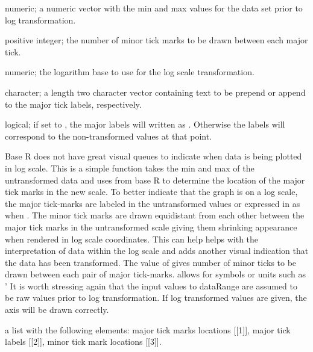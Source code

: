 \documentclass[a4paper]{book}
\begin{document}
\begin{Arguments}
\begin{ldescription}
\item[\code{dataRange}] numeric; a numeric vector with the min and max values for the data set prior to log transformation.

\item[\code{minorCount}] positive integer; the number of minor tick marks to be drawn between each major tick.

\item[\code{logScale}] numeric; the logarithm base to use for the log scale transformation.

\item[\code{axisText}] character; a length two character vector containing text to be prepend or append to the major tick labels, respectively.

\item[\code{expLabels}] logical; if set to , the major labels will written as . Otherwise the labels will correspond to the non-transformed values at that point.
\end{ldescription}
\end{Arguments}
%
\begin{Details}\relax
Base R does not have great visual queues to indicate when data is being plotted in log scale. This is a simple function takes the min and max of the untransformed data and  uses  from base R to determine the location of the major tick marks in the new scale. To better indicate that the graph is on a log scale, the major tick-marks are labeled in the untransformed values or expressed in as  when . The minor tick marks are drawn equidistant from each other between the major tick marks in the untransformed scale giving them shrinking appearance when rendered in log scale coordinates. This can help helps with the interpretation of data within the log scale and adds another visual indication that the data has been transformed. The value of  gives number of minor ticks to be drawn between each pair of major tick-marks.  allows for symbols or units such as '
It is worth stressing again that the input values to dataRange are assumed to be raw values prior to log transformation. If log transformed values are given, the axis will be drawn correctly.
\end{Details}
%
\begin{Value}
a list with the following elements: major tick marks locations [[1]], major tick labels [[2]], minor tick mark locations [[3]].
\end{Value}
\end{document}

